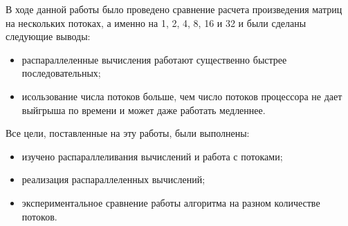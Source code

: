 \Conclusion

В ходе данной работы было проведено сравнение расчета произведения матриц на нескольких потоках,
а именно на 1, 2, 4, 8, 16 и 32 и были сделаны следующие выводы:

\begin{itemize}
    \item распараллеленные вычисления работают существенно быстрее последовательных;
    \item исользование числа потоков больше, чем число потоков процессора не дает выйгрыша по времени и может даже работать медленнее.
\end{itemize}

Все цели, поставленные на эту работы, были выполнены:

\begin{itemize}
    \item изучено распараллеливания вычислений и работа с потоками;
    \item реализация распараллеленных вычислений;
    \item экспериментальное сравнение работы алгоритма на разном количестве потоков.
\end{itemize}


